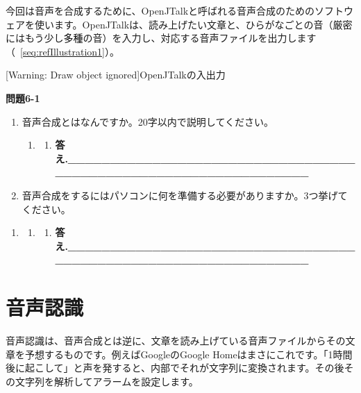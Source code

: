 \documentclass[a4paper,dvipdfmx]{jarticle}
\newcommand\liststyleLi{%
\renewcommand\theenumi{\arabic{enumi}}
\renewcommand\theenumii{\arabic{enumii}}
\renewcommand\theenumiii{\arabic{enumiii}}
\renewcommand\theenumiv{\arabic{enumiv}}
\renewcommand\labelenumi{\theenumi.}
\renewcommand\labelenumii{\theenumii.}
\renewcommand\labelenumiii{\theenumiii.}
\renewcommand\labelenumiv{\theenumiv.}
}
\newcommand\liststyleLii{%
\renewcommand\theenumi{\arabic{enumi}}
\renewcommand\theenumii{\arabic{enumii}}
\renewcommand\theenumiii{\arabic{enumiii}}
\renewcommand\theenumiv{\arabic{enumiv}}
\renewcommand\labelenumi{\theenumi.}
\renewcommand\labelenumii{\theenumii.}
\renewcommand\labelenumiii{\theenumiii.}
\renewcommand\labelenumiv{\theenumiv.}
}
\begin{document}
{
今回は音声を合成するために、OpenJTalkと呼ばれる音声合成のためのソフトウェアを使います。OpenJTalkは、読み上げたい文章と、ひらがなごとの音（厳密にはもう少し\textcolor{black}{多種}の音）を入力し、対応する音声ファイルを出力します（\figurename~\ref{seq:refIllustration1}）。}



\centering
\caption[OpenJTalkの入出力]{[Warning: Draw object ignored]OpenJTalkの入出力}
\label{seq:refIllustration1}

{\bfseries
問題6-1}

\liststyleLi
\begin{enumerate}
\item {
音声合成とはなんですか。20字以内で説明してください。}


\bigskip

\begin{enumerate}
\item \begin{enumerate}
\item[] {\raggedleft\ttfamily\bfseries
答え.\_\_\_\_\_\_\_\_\_\_\_\_\_\_\_\_\_\_\_\_\_\_\_\_\_\_\_\_\_\_\_\_\_\_\_\_\_\_\_\_\_\_\_\_\_\_\_\_\_\_\_\_\_\_\_\_\_\_\_\_\_\_\_\_
\par}
\end{enumerate}
\end{enumerate}
\item {
音声合成をするにはパソコンに何を準備する必要がありますか。3つ挙げてください。}
\end{enumerate}
\liststyleLii
\begin{enumerate}
\item[] 
\bigskip

\begin{enumerate}
\item \begin{enumerate}
\item[] {\raggedleft\ttfamily\bfseries
答え.\_\_\_\_\_\_\_\_\_\_\_\_\_\_\_\_\_\_\_\_\_\_\_\_\_\_\_\_\_\_\_\_\_\_\_\_\_\_\_\_\_\_\_\_\_\_\_\_\_\_\_\_\_\_\_\_\_\_\_\_\_\_\_\_
\par}
\end{enumerate}
\end{enumerate}
\end{enumerate}

\bigskip

\clearpage\section{音声認識}
{
音声認識は、音声合成とは逆に、文章を読み上げている音声ファイルからその文章を予想するものです。例えばGoogleのGoogle
Homeはまさにこれです。「1時間後に起こして」と声を発すると、内部でそれが文字列に変換されます。その後その文字列を解析してアラームを設定します。}
\end{document}
